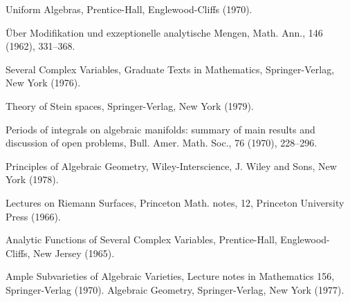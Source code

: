 \begin{sourcebibliography}
 Uniform Algebras, Prentice-Hall, Englewood-Cliffs (1970).
\end{sourcebibliography}
\begin{sourcebibliography}
 \"Uber Modifikation und exzeptionelle analytische Mengen, Math. Ann., 146 (1962), 331--368.
\end{sourcebibliography}
\begin{sourcebibliography}
 Several Complex Variables, Graduate Texts in Mathematics, Springer-Verlag, New York (1976).
\end{sourcebibliography}
\begin{sourcebibliography}
 Theory of Stein spaces, Springer-Verlag, New York (1979).
\end{sourcebibliography}
\begin{sourcebibliography}
 Periods of integrals on algebraic manifolds: summary of main results and discussion of open problems, Bull. Amer. Math. Soc., 76 (1970), 228--296.
\end{sourcebibliography}
\begin{sourcebibliography}
 Principles of Algebraic Geometry, Wiley-Interscience, J. Wiley and Sons, New York (1978).
\end{sourcebibliography}
\begin{sourcebibliography}
 Lectures on Riemann Surfaces, Princeton Math. notes, 12, Princeton University Press (1966).
\end{sourcebibliography}
\begin{sourcebibliography}
 Analytic Functions of Several Complex Variables, Prentice-Hall, Englewood-Cliffs, New Jersey (1965).
\end{sourcebibliography}
\begin{sourcebibliography}
 Ample Subvarieties of Algebraic Varieties, Lecture notes in Mathematics 156, Springer-Verlag (1970).
 Algebraic Geometry, Springer-Verlag, New York (1977).
\end{sourcebibliography}

